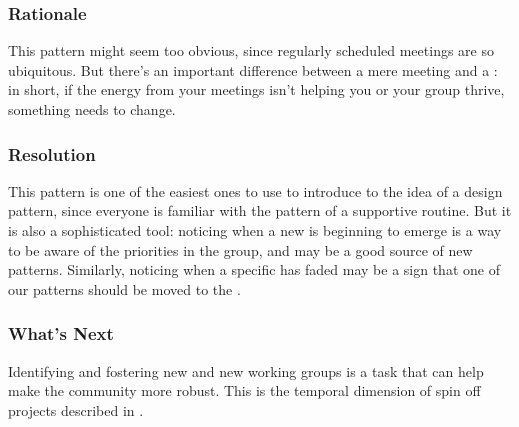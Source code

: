 \subsubsection*{Rationale}  This pattern might seem too obvious, since regularly scheduled meetings are so ubiquitous.  But there's an important difference between a mere meeting and a : in short, if the energy from your meetings isn't helping you or your group thrive, something needs to change.

\subsubsection*{Resolution} This pattern is one of the easiest ones to use to introduce  to the idea of a design pattern, since everyone is familiar with the pattern of a supportive routine.  But it is also a sophisticated tool: noticing when a new  is beginning to emerge is a way to be aware of the priorities in the group, and may be a good source of new patterns.  Similarly, noticing when a specific  has faded may be a sign that one of our patterns should be moved to the .

\subsubsection*{What's Next} Identifying and fostering new  and new working groups is a task that can help make the community more robust.  This is the temporal dimension of spin off projects described in .

